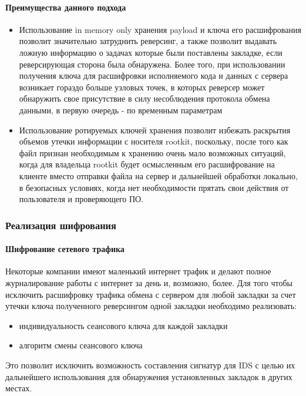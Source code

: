 \paragraph{Преимущества данного подхода}
\begin{itemize}
\item{ Использование in memory only хранения payload и ключа его расшифрования
позволит значительно затруднить реверсинг, а также позволит выдавать ложную
информацию о задачах которые были поставлены закладке, если реверсирующая
сторона была обнаружена. Более того, при использовании получения ключа для
расшифровки исполняемого кода и данных с сервера возникает гораздо больше
узловых точек, в которых реверсер может обнаружить свое присутствие в силу
несоблюдения протокола обмена данными, в первую очередь - по временным параметрам}
\item{
 Использование ротируемых ключей хранения позволит избежать раскрытия объемов
 утечки информации с носителя rootkit, поскольку, после того как файл признан
 необходимым к хранению очень мало возможных ситуаций, когда для владельца rootkit
 будет осмысленным его расшифрование на клиенте вместо отправки файла на сервер и
 дальнейшей обработки локально, в безопасных условиях, когда нет необходимости
 прятать свои действия от пользователя и проверяющего ПО.
}
\end{itemize}

\subsubsection{Реализация шифрования}

\paragraph{Шифрование сетевого трафика\\}
Некоторые компании имеют маленький интернет трафик и делают полное
журналирование работы с интернет за день и, возможно, более. Для того
чтобы исключить расшифровку трафика обмена с сервером для любой закладки
за счет утечки ключа полученного реверсингом одной закладки необходимо
реализовать:

\begin{itemize}
\item{индивидуальность сеансового ключа для каждой закладки}
\item{алгоритм смены сеансового ключа}
\end{itemize}

Это позволит исключить возможность составления сигнатур для IDS с целью
их дальнейшего использования для обнаружения установленных закладок в
других местах.\\

